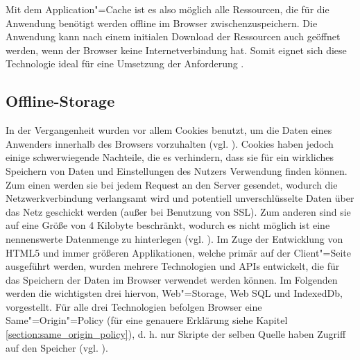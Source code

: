 Mit dem Application"=Cache ist es also möglich alle Ressourcen, die für die Anwendung benötigt werden offline im Browser zwischenzuspeichern. Die Anwendung kann nach einem initialen Download der Ressourcen auch geöffnet werden, wenn der Browser keine Internetverbindung hat. Somit eignet sich diese Technologie ideal für eine Umsetzung der Anforderung .

\subsection{Offline-Storage}\label{section:offline_storage}
In der Vergangenheit wurden vor allem Cookies benutzt, um die Daten eines Anwenders innerhalb des Browsers vorzuhalten (vgl. \cite{Mahemoff22010}). Cookies haben jedoch einige schwerwiegende Nachteile, die es verhindern, dass sie für ein wirkliches Speichern von Daten und Einstellungen des Nutzers Verwendung finden können. Zum einen werden sie bei jedem Request an den Server gesendet, wodurch die Netzwerkverbindung verlangsamt wird und potentiell unverschlüsselte Daten über das Netz geschickt werden (außer bei Benutzung von \ac{SSL}). Zum anderen sind sie auf eine Größe von 4 Kilobyte beschränkt, wodurch es nicht möglich ist eine nennenswerte Datenmenge zu hinterlegen (vgl. \cite{html5upandrunning}). Im Zuge der Entwicklung von \ac{HTML}5 und immer größeren Applikationen, welche primär auf der Client"=Seite ausgeführt werden, wurden mehrere Technologien und \acp{API} entwickelt, die für das Speichern der Daten im Browser verwendet werden können. Im Folgenden werden die wichtigsten drei hiervon, Web"=Storage, Web \ac{SQL} und IndexedDb, vorgestellt. Für alle drei Technologien befolgen Browser eine Same"=Origin"=Policy (für eine genauere Erklärung siehe Kapitel \ref{section:same_origin_policy}), d. h. nur Skripte der selben Quelle haben Zugriff auf den Speicher (vgl. \cite{Mahemoff2010}).

